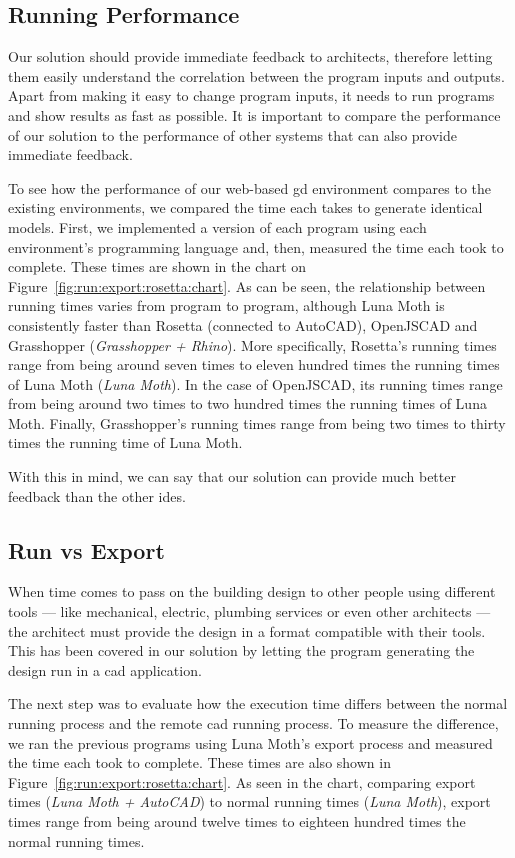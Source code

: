 \subsection{Running Performance}
Our solution should provide immediate feedback to architects, therefore letting them easily understand the correlation between the program inputs and outputs\cite{Leitao2014illustrated}.
Apart from making it easy to change program inputs, it needs to run programs and show results as fast as possible.
It is important to compare the performance of our solution to the performance of other systems that can also provide immediate feedback.

To see how the performance of our web-based \gls{gd} environment compares to the existing environments, we compared the time each takes to generate identical models.
First, we implemented a version of each program using each environment's programming language and, then, measured the time each took to complete.
These times are shown in the chart on Figure~\ref{fig:run:export:rosetta:chart}.
As can be seen, the relationship between running times varies from program to program, although Luna Moth is consistently faster than Rosetta (connected to AutoCAD), OpenJSCAD and Grasshopper (\textit{Grasshopper + Rhino}).
More specifically, Rosetta's running times range from being around seven times to eleven hundred times the running times of Luna Moth (\textit{Luna Moth}).
In the case of OpenJSCAD, its running times range from being around two times to two hundred times the running times of Luna Moth.
Finally, Grasshopper's running times range from being two times to thirty times the running time of Luna Moth.

With this in mind, we can say that our solution can provide much better feedback than the other \glspl{ide}.


\subsection{Run vs Export}
\label{sec:eval:export}
When time comes to pass on the building design to other people using different tools --- like mechanical, electric, plumbing services or even other architects --- the architect must provide the design in a format compatible with their tools.
This has been covered in our solution by letting the program generating the design run in a \gls{cad} application.

The next step was to evaluate how the execution time differs between the normal running process and the remote \gls{cad} running process.
To measure the difference, we ran the previous programs using Luna Moth's export process and measured the time each took to complete.
These times are also shown in Figure~\ref{fig:run:export:rosetta:chart}.
As seen in the chart, comparing export times (\textit{Luna Moth + AutoCAD}) to normal running times (\textit{Luna Moth}), export times range from being around twelve times to eighteen hundred times the normal running times.

